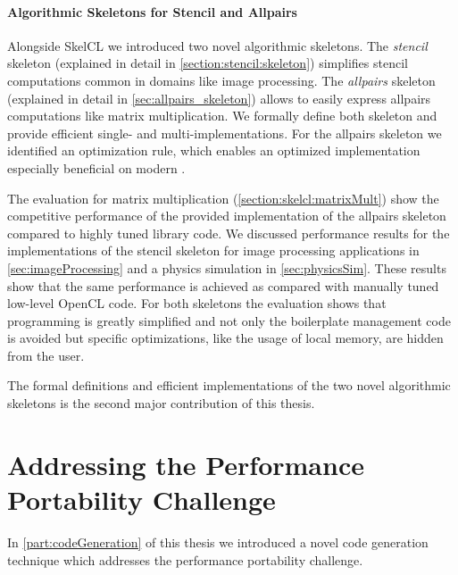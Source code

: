 \paragraph{Algorithmic Skeletons for Stencil and Allpairs}
Alongside SkelCL we introduced two novel algorithmic skeletons.
The \emph{stencil} skeleton (explained in detail in \autoref{section:stencil:skeleton}) simplifies stencil computations common in domains like image processing.
The \emph{allpairs} skeleton (explained in detail in \autoref{sec:allpairs_skeleton}) allows to easily express allpairs computations like matrix multiplication.
We formally define both skeleton and provide efficient single- and multi-\GPU implementations.
For the allpairs skeleton we identified an optimization rule, which enables an optimized implementation especially beneficial on modern \GPUs.

The evaluation for matrix multiplication (\autoref{section:skelcl:matrixMult}) show the competitive performance of the provided implementation of the allpairs skeleton compared to highly tuned library code.
We discussed performance results for the implementations of the stencil skeleton for image processing applications in \autoref{sec:imageProcessing} and a physics simulation in \autoref{sec:physicsSim}.
These results show that the same performance is achieved as compared with manually tuned low-level OpenCL code.
For both skeletons the evaluation shows that programming is greatly simplified and not only the boilerplate management code is avoided but \GPU specific optimizations, like the usage of local memory, are hidden from the user.

\bigskip
The formal definitions and efficient \GPU implementations of the two novel algorithmic skeletons is the second major contribution of this thesis.


\section{Addressing the Performance Portability Challenge}
In \autoref{part:codeGeneration} of this thesis we introduced a novel code generation technique which addresses the performance portability challenge.

